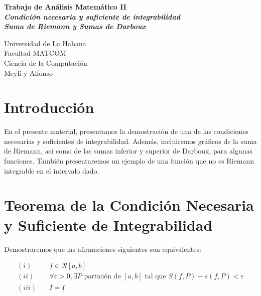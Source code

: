 \documentclass[a4paper,12pt]{article}
\title{}
\author{}
\date{}
\begin{document}
	
\begin{titlepage}
	\centering
	\vspace*{1in}
	{\Huge \textbf{Trabajo de Análisis Matemático II}} \\[2cm]
	{\LARGE \textbf{\textit{{Condición necesaria y suficiente de integrabilidad}}}} \\[0.5cm]
	{\LARGE \textbf{\textit{{Suma de Riemann y Sumas de Darboux}}}}\\[1cm]
	
	
	\vfill 
	
	
	\begin{minipage}{\textwidth}
		\raggedright
		{\large Universidad de La Habana} \\[1cm]
		{\large Facultad MATCOM} \\[1cm]
		{\large Ciencia de la Computación} \\[0.5cm]
		{\large Meylí y Alfonso}
	\end{minipage}
\end{titlepage}
	\section{Introducción}
	En el presente material, presentamos la demostración de una de las condiciones necesarias y suficientes de integrabilidad. Además, incluiremos gráficos de la suma de Riemann, así como de las sumas inferior y superior de Darboux, para algunas funciones. También presentaremos un ejemplo de una función que no es Riemann integrable en el intervalo dado.
	
	\section{Teorema de la Condición Necesaria y Suficiente de Integrabilidad}
	Demostraremos que las afirmaciones siguientes son equivalentes:
	
	\[
	\begin{aligned}
		(i) &\quad f \in \mathcal{R}[a,b]  \\
		(ii) &\quad \forall \varepsilon > 0, \exists P \text{ partición de } [a,b] \text{ tal que } S(f,P) - s(f,P) < \varepsilon  \\
		(iii) &\quad \overline{I} = \underline{I}
	\end{aligned}
	\]
	\quad \\
	
\end{document}
